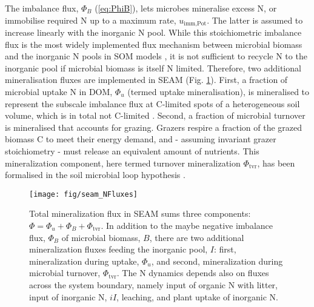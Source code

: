 The imbalance flux, $\Phi_B$ (\ref{eq:PhiB}), lets microbes mineralise excess N,
or immobilise required N up to a maximum rate, $u_{\operatorname{imm,Pot}}$. The
latter is assumed to increase linearly with the inorganic N pool.
While this stoichiometric imbalance flux is the most widely implemented flux
mechanism between microbial biomass and the inorganic N pools in SOM models
\citep{Manzoni09}, it is not sufficient to recycle N to the inorganic pool if
microbial biomass is itself N limited.
Therefore, two additional mineralisation fluxes are implemented in SEAM (Fig.
\ref{fig:SEAMStructNFluxes}). First, a fraction of microbial uptake N in DOM,
$\Phi_u$ (termed uptake mineralisation), is mineralised to represent the
subscale imbalance flux at C-limited spots of a heterogeneous soil volume, which
is in total not C-limited \citep{Manzoni08}.
Second, a fraction of microbial turnover is mineralised that accounts for
grazing. Grazers respire a fraction of the grazed biomass C to meet their energy
demand, and - assuming invariant grazer stoichiometry  - must release an
equivalent amount of nutrients.
This mineralization component, here termed turnover mineralization
$\Phi_{\operatorname{tvr}}$, has been formalised in the soil microbial loop
hypothesis \citep{Clarholm85, Raynaud06}.

\begin{figure}[t] \vspace*{2mm}
\begin{center}
\texttt{[image: fig/seam\_NFluxes]} 
\end{center}
\caption{
Total mineralization flux in SEAM sums three components: $\Phi = \Phi_u +
\Phi_B + \Phi_{\operatorname{tvr}}$. In addition to the maybe negative imbalance
flux, $\Phi_B$ of microbial biomass, $B$, there are two additional
mineralization fluxes feeding the inorganic pool, $I$: first, mineralization
during uptake, $\Phi_u$, and second, mineralization during microbial turnover,
$\Phi_{\operatorname{tvr}}$.
The N dynamics depends also on fluxes across the system boundary, namely input
of organic N with litter, input of inorganic N, $iI$, leaching, and plant uptake
of inorganic N.
\label{fig:SEAMStructNFluxes}}
\end{figure}

